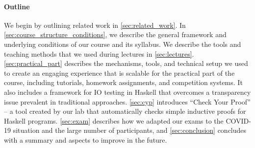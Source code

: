 \paragraph{Outline}

We begin by outlining related work in \cref{sec:related_work}.
In \cref{sec:course_structure_conditions},
we describe the general framework and underlying conditions of our course and its syllabus.
We describe the tools and teaching methods that we used during lectures in \cref{sec:lectures}.
\cref{sec:practical_part} describes the
mechanisms, tools, and technical setup
we used to create an engaging experience
that is scalable
for the practical part of the course,
including tutorials, homework assignments, and
competition systems.
It also includes a framework for IO
testing in Haskell
that overcomes a transparency issue prevalent in traditional approaches.
\cref{sec:cyp} introduces
``Check Your Proof'' -- a tool created
by our lab that automatically checks simple inductive proofs for Haskell programs.
\cref{sec:exam} describes how we adapted our exams to the COVID-19 situation and the large number of participants,
and \cref{sec:conclusion} concludes with a summary and aspects to improve in the future.

